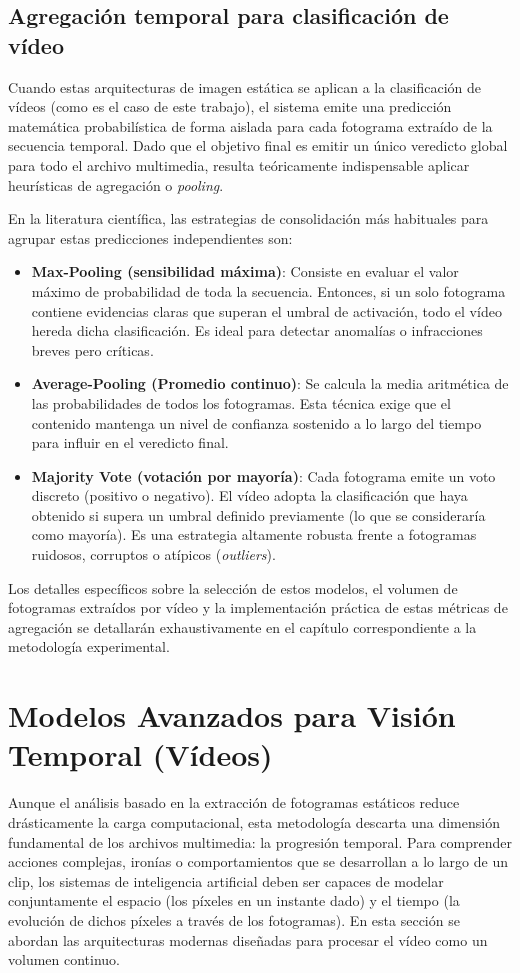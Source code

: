 \subsection{Agregación temporal para clasificación de vídeo}
\label{subsec:inferenciaViT}
Cuando estas arquitecturas de imagen estática se aplican a la clasificación de vídeos (como es el caso de este trabajo), el sistema emite una predicción matemática probabilística de forma aislada para cada fotograma extraído de la secuencia temporal. Dado que el objetivo final es emitir un único veredicto global para todo el archivo multimedia, resulta teóricamente indispensable aplicar heurísticas de agregación o \textit{pooling}.

En la literatura científica, las estrategias de consolidación más habituales para agrupar estas predicciones independientes son: 
\begin{itemize}
    \item \textbf{Max-Pooling (sensibilidad máxima)}: Consiste en evaluar el valor máximo de probabilidad de toda la secuencia. Entonces, si un solo fotograma contiene evidencias claras que superan el umbral de activación, todo el vídeo hereda dicha clasificación. Es ideal para detectar anomalías o infracciones breves pero críticas. 
    \item \textbf{Average-Pooling (Promedio continuo)}: Se calcula la media aritmética de las probabilidades de todos los fotogramas. Esta técnica exige que el contenido mantenga un nivel de confianza sostenido a lo largo del tiempo para influir en el veredicto final. 
    \item \textbf{Majority Vote (votación por mayoría)}: Cada fotograma emite un voto discreto (positivo o negativo). El vídeo adopta la clasificación que haya obtenido si supera un umbral definido previamente (lo que se consideraría como mayoría). Es una estrategia altamente robusta frente a fotogramas ruidosos, corruptos o atípicos (\textit{outliers}). 
\end{itemize}

Los detalles específicos sobre la selección de estos modelos, el volumen de fotogramas extraídos por vídeo y la implementación práctica de estas métricas de agregación se detallarán exhaustivamente en el capítulo correspondiente a la metodología experimental.  

\section{Modelos Avanzados para Visión Temporal (Vídeos)}
\label{sec:ModelosAvanzadosParaVisionTemporal}
Aunque el análisis basado en la extracción de fotogramas estáticos reduce drásticamente la carga computacional, esta metodología descarta una dimensión fundamental de los archivos multimedia: la progresión temporal. Para comprender acciones complejas, ironías o comportamientos que se desarrollan a lo largo de un clip, los sistemas de inteligencia artificial deben ser capaces de modelar conjuntamente el espacio (los píxeles en un instante dado) y el tiempo (la evolución de dichos píxeles a través de los fotogramas). En esta sección se abordan las arquitecturas modernas diseñadas para procesar el vídeo como un volumen continuo. 

